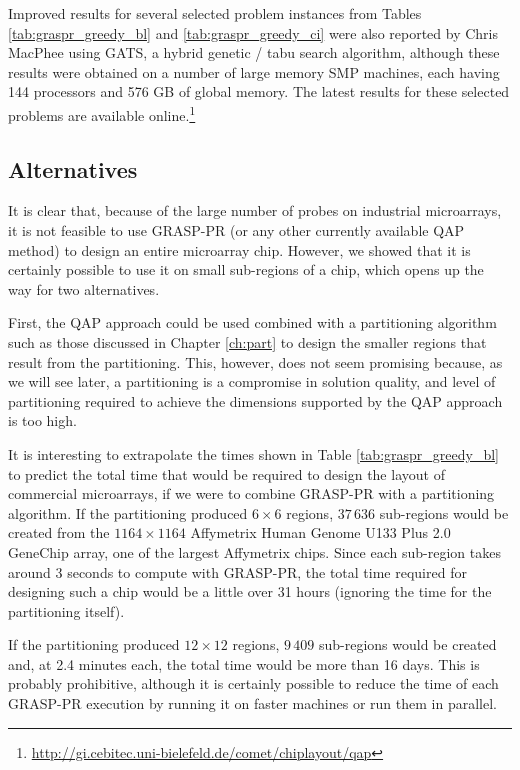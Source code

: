 Improved results for several selected problem instances from Tables
\ref{tab:graspr_greedy_bl} and \ref{tab:graspr_greedy_ci} were also reported by
Chris MacPhee using GATS, a hybrid genetic / tabu search algorithm, although
these results were obtained on a number of large memory SMP machines, each
having 144 processors and 576 GB of global memory. The latest results for these
selected problems are available
online.\footnote{\url{http://gi.cebitec.uni-bielefeld.de/comet/chiplayout/qap}}

\subsection{Alternatives}

It is clear that, because of the large number of probes on industrial
microarrays, it is not feasible to use GRASP-PR (or any other currently
available QAP method) to design an entire microarray chip. However, we showed
that it is certainly possible to use it on small sub-regions of a chip, which
opens up the way for two alternatives.

First, the QAP approach could be used combined with a partitioning algorithm
such as those discussed in Chapter \ref{ch:part} to design the smaller
regions that result from the partitioning. This, however, does not seem
promising because, as we will see later, a partitioning is a compromise in
solution quality, and level of partitioning required to achieve the dimensions
supported by the QAP approach is too high.

It is interesting to extrapolate the times shown in Table
\ref{tab:graspr_greedy_bl} to predict the total time that would be required to
design the layout of commercial microarrays, if we were to combine GRASP-PR with
a partitioning algorithm. If the partitioning produced $6\times 6$ regions,
$37\,636$ sub-regions would be created from the $1164\times 1164$ Affymetrix
Human Genome U133 Plus 2.0 GeneChip array, one of the largest Affymetrix chips.
Since each sub-region takes around 3 seconds to compute with GRASP-PR, the total
time required for designing such a chip would be a little over 31 hours
(ignoring the time for the partitioning itself).

If the partitioning produced $12\times 12$ regions, $9\,409$ sub-regions would
be created and, at 2.4 minutes each, the total time would be more than 16 days.
This is probably prohibitive, although it is certainly possible to reduce the
time of each GRASP-PR execution by running it on faster machines or run them in
parallel.

